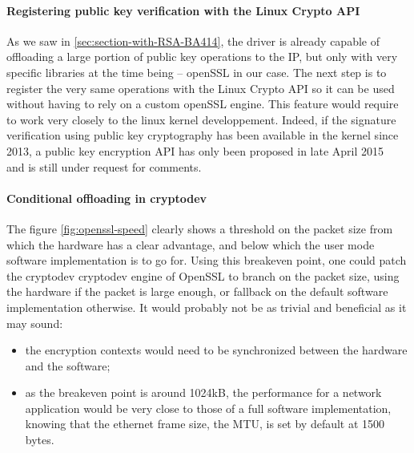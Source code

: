 \paragraph{Registering public key verification with the Linux Crypto API}
As we saw in \ref{sec:section-with-RSA-BA414}, the driver is already capable of offloading a large portion of public key operations to the IP, but only with very specific libraries at the time being -- openSSL in our case.
The next step is to register the very same operations with the Linux Crypto API so it can be used without having to rely on a custom openSSL engine.
This feature would require to work very closely to the linux kernel developpement.
Indeed, if the signature verification using public key cryptography has been available in the kernel since 2013, a public key encryption API has only been proposed in late April 2015~\cite{crypto-api-pk-encryption} and is still under request for comments.

\paragraph{Conditional offloading in cryptodev}
The figure \ref{fig:openssl-speed} clearly shows a threshold on the packet size from which the hardware has a clear advantage, and below which the user mode software implementation is to go for.
Using this breakeven point, one could patch the cryptodev cryptodev engine of OpenSSL to branch on the packet size, using the hardware if the packet is large enough, or fallback on the default software implementation otherwise. %
It would probably not be as trivial and beneficial as it may sound:
\begin{itemize}
	\item the encryption contexts would need to be synchronized between the hardware and the software;
	\item as the breakeven point is around 1024kB, the performance for a network application would be very close to those of a full software implementation, knowing that the ethernet frame size, the MTU, is set by default at 1500 bytes.
\end{itemize}

